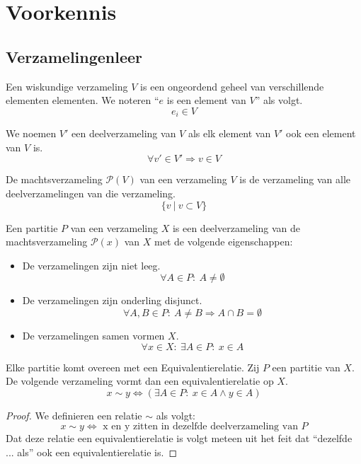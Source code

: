 \documentclass[main.tex]{subfiles}
\begin{document}
\chapter{Voorkennis}
\label{cha:voorkennis}

\section{Verzamelingenleer}
\label{sec:verzamelingenleer}

\begin{de}
  Een wiskundige verzameling $V$ is een ongeordend geheel van verschillende elementen elementen.
  We noteren ``$e$ is een element van $V$'' als volgt.
  \[ e_i \in V \]
\end{de}

\begin{de}
  We noemen $V'$ een deelverzameling van $V$ als elk element van $V'$ ook een element van $V$ is.
  \[ \forall v' \in V' \Rightarrow v \in V \]
\end{de}

\begin{de}
  De machtsverzameling $\mathcal{P}(V)$ van een verzameling $V$ is de verzameling van alle deelverzamelingen van die verzameling.
  \[ \{v\ |\ v\subset V \}\] 
\end{de}

\begin{de}
  \label{de:partitie}
  Een partitie $P$ van een verzameling $X$ is een deelverzameling van de machtsverzameling $\mathcal {P}(x)$ van $X$ met de volgende eigenschappen:
  \begin{itemize}
  \item De verzamelingen zijn niet leeg.
    \[ \forall A \in P:\ A \neq \emptyset \]
  \item De verzamelingen zijn onderling disjunct.
    \[ \forall A,B \in P:\ A \neq B \Rightarrow A \cap B = \emptyset \]
  \item De verzamelingen samen vormen $X$.
    \[ \forall x \in X:\ \exists A \in P:\ x \in A \]
  \end{itemize}
\end{de}

\begin{st}
  \label{st:verband-partitie-equivalentierelatie}
  Elke partitie komt overeen met een Equivalentierelatie. Zij $P$ een partitie van $X$.
  De volgende verzameling vormt dan een equivalentierelatie op $X$.
  \[ x \sim y \Leftrightarrow (\exists A \in P:\ x \in A \wedge y \in A )\]

  \begin{proof}
    We definieren een relatie $\sim$ als volgt:
    \[
    x \sim y \Leftrightarrow \text{ x en y zitten in dezelfde deelverzameling van } P
    \]
    Dat deze relatie een equivalentierelatie is volgt meteen uit het feit dat ``dezelfde ... als'' ook een equivalentierelatie is.
  \end{proof}
\end{st}
\end{document}
